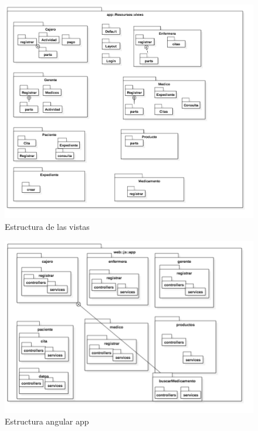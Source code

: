 	\begin{figure}[htbp!]
		\centering
			\includegraphics[width=1\textwidth]{images/logico33}
		\caption{Estructura de las vistas}
	\end{figure}
	
	\begin{figure}[htbp!]
		\centering
			\includegraphics[width=1\textwidth]{images/logico34}
		\caption{Estructura angular app}
	\end{figure}
	
